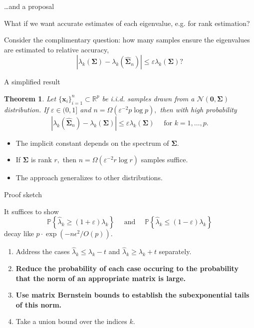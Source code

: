 \documentclass[pdf,mpa]{prosper}
\newcommand{\mat}[1]{\ensuremath{\mathbf{#1}}}
\newcommand{\Prob}[1]{\ensuremath{\mathbb{P}\left\{#1 \right\}}}
\renewcommand{\R}{\ensuremath{\mathbb{R}}}
\newtheorem*{thm}{Theorem}
\begin{document}
\begin{slide}{\dots and a proposal}

What if we want accurate estimates of each eigenvalue, e.g. for rank estimation?

Consider the complimentary question:
how many samples ensure the eigenvalues are estimated to relative accuracy,
\[
|\lambda_k(\mat{\Sigma}) - \lambda_k(\widehat{\mat{\Sigma}}_n)| \leq \varepsilon \lambda_k(\mat{\Sigma})?
\]

\end{slide}

\begin{slide}{A simplified result}

\begin{thm}
Let $\{\mat{x}_i\}_{i=1}^n \subset \R^p$ be i.i.d. samples drawn from a $\mathcal{N}(\mat{0}, \mat{\Sigma})$ distribution. 
If $\varepsilon \in (0, 1]$ and $n = \Omega(\varepsilon^{-2} p \log p),$ then with high probability
\[
|\lambda_k(\widehat{\mat{\Sigma}}_n) - \lambda_k(\mat{\Sigma})| \leq \varepsilon \lambda_k(\mat{\Sigma}) \quad \text{ for } k=1,\ldots,p.
\]
\end{thm}
\begin{itemize}
	\item The implicit constant depends on the spectrum of $\mat{\Sigma}.$
	\item If $\mat{\Sigma}$ is rank $r,$ then $n= \Omega(\varepsilon^{-2} r \log r)$ samples suffice.
	\item The approach generalizes to other distributions.
\end{itemize}
\end{slide}

\begin{slide}{Proof sketch}

It suffices to show
\[
 \textstyle \Prob{\hat{\lambda}_k \geq (1+\varepsilon) \lambda_k } \quad \text{ and } \quad \Prob{\hat{\lambda}_k \leq (1-\varepsilon) \lambda_k}
\]
decay like $p\cdot \exp(-n\epsilon^2/O(p)).$

\begin{enumerate}
	\item Address the cases $\hat{\lambda}_k \leq \lambda_k -t $ and $\hat{\lambda}_k \geq \lambda_k + t$ separately. 

	\item {\bf Reduce the probability of each case occuring to the probability that the norm of an appropriate matrix is large.}

	\item {\bf Use matrix Bernstein bounds to establish the subexponential tails of this norm. }

	\item Take a union bound over the indices $k.$
 \end{enumerate}
 
\end{slide}
\end{document}
